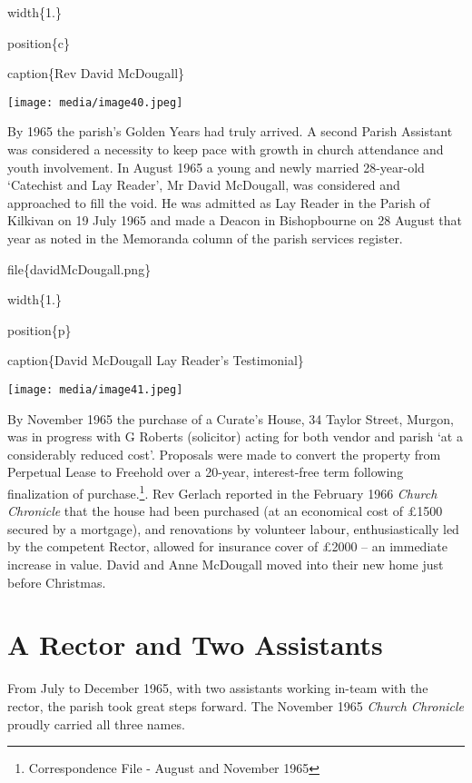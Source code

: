 width\{1.\}

position\{c\}

caption\{Rev David McDougall\}

\texttt{[image: media/image40.jpeg]}

By 1965 the parish's Golden Years had truly arrived. A second Parish Assistant was considered a necessity to keep pace with growth in church attendance and youth involvement. In August 1965 a young and newly married 28-year-old `Catechist and Lay Reader', Mr David McDougall, was considered and approached to fill the void. He was admitted as Lay Reader in the Parish of Kilkivan on 19 July 1965 and made a Deacon in Bishopbourne on 28 August that year as noted in the Memoranda column of the parish services register.

file\{davidMcDougall.png\}

width\{1.\}

position\{p\}

caption\{David McDougall Lay Reader's Testimonial\}

\texttt{[image: media/image41.jpeg]}

By November 1965 the purchase of a Curate's House, 34 Taylor Street, Murgon, was in progress with G Roberts (solicitor) acting for both vendor and parish `at a considerably reduced cost'. Proposals were made to convert the property from Perpetual Lease to Freehold over a 20-year, interest-free term following finalization of purchase.\footnote{Correspondence File - August and November 1965}. Rev Gerlach reported in the February 1966 \emph{Church Chronicle} that the house had been purchased (at an economical cost of £1500 secured by a mortgage), and renovations by volunteer labour, enthusiastically led by the competent Rector, allowed for insurance cover of £2000 -- an immediate increase in value. David and Anne McDougall moved into their new home just before Christmas.

\hypertarget{a-rector-and-two-assistants}{%
\section{A Rector and Two Assistants}\label{a-rector-and-two-assistants}}

From July to December 1965, with two assistants working in-team with the rector, the parish took great steps forward. The November 1965 \emph{Church Chronicle} proudly carried all three names.

